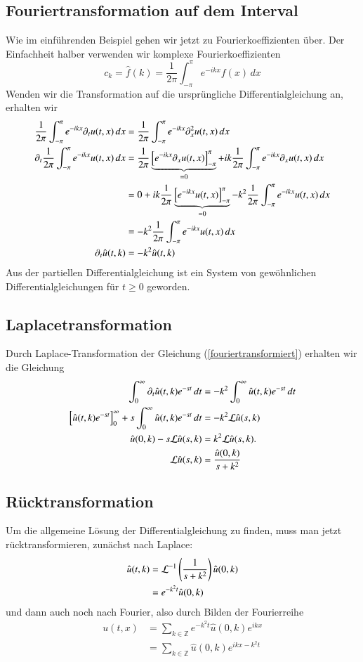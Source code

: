 \subsection{Fouriertransformation auf dem Interval}
Wie im einführenden Beispiel gehen wir jetzt zu Fourierkoeffizienten
über.
Der Einfachheit halber verwenden wir komplexe Fourierkoeffizienten
\[
c_k=\hat f(k)=\frac1{2\pi}\int_{-\pi}^{\pi}e^{-ikx}f(x)\,dx
\]
Wenden wir die Transformation auf die ursprüngliche Differentialgleichung
an, erhalten wir
\begin{align}
\frac1{2\pi}\int_{-\pi}^{\pi}e^{-ikx}\partial_t u(t,x)\,dx
&=\frac1{2\pi}\int_{-\pi}^{\pi}e^{-ikx}\partial_x^2 u(t,x)\,dx
\notag
\\
\partial_t\frac1{2\pi}\int_{-\pi}^{\pi}e^{-ikx} u(t,x)\,dx
&=
\frac1{2\pi}
\underbrace{
\left[
e^{-ikx}\partial_x u(t,x)
\right]_{-\pi}^{\pi}}_{=0}
+
ik\frac1{2\pi}\int_{-\pi}^{\pi}e^{-ikx}\partial_x u(t,x)\,dx
\notag
\\
&=
0 + 
ik\frac1{2\pi}
\underbrace{
\left[
e^{-ikx}u(t,x)
\right]_{-\pi}^{\pi}}_{=0}
-
k^2\frac1{2\pi}\int_{-\pi}^{\pi}e^{-ikx} u(t,x)\,dx
\notag
\\
&=
-
k^2\frac1{2\pi}\int_{-\pi}^{\pi}e^{-ikx} u(t,x)\,dx
\notag
\\
\partial_t\hat u(t,k)&=-k^2 \hat u(t,k)
\label{fouriertransformiert}
\end{align}
Aus der partiellen Differentialgleichung ist ein System von gewöhnlichen
Differentialgleichungen für $t\ge 0$ geworden.

\subsection{Laplacetransformation}
Durch Laplace-Transformation der Gleichung (\ref{fouriertransformiert})
erhalten wir die Gleichung
\begin{align*}
\int_0^{\infty} \partial_t \hat u(t,k)e^{-st}\,dt
&=
-k^2\int_0^{\infty}\hat u(t,k)e^{-st}\,dt
\\
\left[\hat u(t,k)e^{-st}\right]_0^{\infty}
+
s\int_0^{\infty}\hat u(t,k)e^{-st}\,dt
&=
-k^2{\cal L}\hat u(s,k)
\\
\hat u(0,k)-s{\cal L}\hat u(s,k)&=k^2{\cal L}\hat u(s,k).
\\
{\cal L}\hat u(s,k)&=\frac{\hat u(0,k)}{s+k^2}
\end{align*}

\subsection{Rücktransformation}
Um die allgemeine Lösung der Differentialgleichung zu finden,
muss man jetzt rücktransformieren, zunächst nach Laplace:
\begin{align*}
\hat u(t,k)&={\cal L}^{-1}\left(\frac1{s+k^2}\right)\hat u(0,k)
\\
&=e^{-k^2t}\hat u(0,k)
\end{align*}
und dann auch noch nach Fourier, also durch Bilden der Fourierreihe
\begin{align*}
u(t,x)&=\sum_{k\in\mathbb Z}e^{-k^2t}\hat u(0,k)e^{ikx}
\\
&=\sum_{k\in\mathbb Z}\hat u(0,k)e^{ikx-k^2t}
\end{align*}

